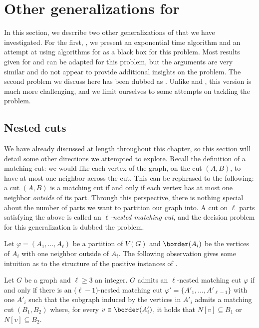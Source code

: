 \section{Other generalizations for }

In this section, we describe two other generalizations of  that we have investigated.
For the first, , we present an exponential time algorithm and an attempt at using algorithms for  as a black box for this problem.
Most results given for  and  can be adapted for this problem, but the arguments are very similar and do not appear to provide additional insights on the problem.
The second problem we discuss here has been dubbed as .
Unlike  and , this version is much more challenging, and we limit ourselves to some attempts on tackling the problem.

\subsection{Nested cuts}

We have already discussed  at length throughout this chapter, so this section will detail some other directions we attempted to explore.
Recall the definition of a matching cut: we would like each vertex of the graph, on the cut $(A,B)$, to have at most one neighbor across the cut.
This can be rephrased to the following: a cut $(A,B)$ is a matching cut if and only if each vertex has at most one neighbor \textit{outside} of its part.
Through this perspective, there is nothing special about the number of parts we want to partition our graph into.
A cut on $\ell$ parts satisfying the above is called an \textit{$\ell$-nested matching cut}, and the decision problem for this generalization is dubbed the  problem.


Let $\varphi = (A_1, \dots, A_\ell)$ be a partition of $V(G)$ and $\border(A_i)$ be the vertices of $A_i$ with one neighbor outside of $A_i$.
The following observation gives some intuition as to the structure of the positive instances of .

\begin{observation}
	\label{obs:nested_cut}
    Let $G$ be a graph and $\ell \geq 3$ an integer.
    $G$ admits an $\ell$-nested matching cut $\varphi$ if and only if there is an ($\ell-1$)-nested matching cut $\varphi' = \{A'_1, \dots, A'_{\ell - 1}\}$ with one $A'_i$ such that the subgraph induced by the vertices in $A'_i$ admits a matching cut $(B_1, B_2)$ where, for every $v \in \border(A'_i)$, it holds that $N[v] \subseteq B_1$ or $N[v] \subseteq B_2$.
\end{observation}

